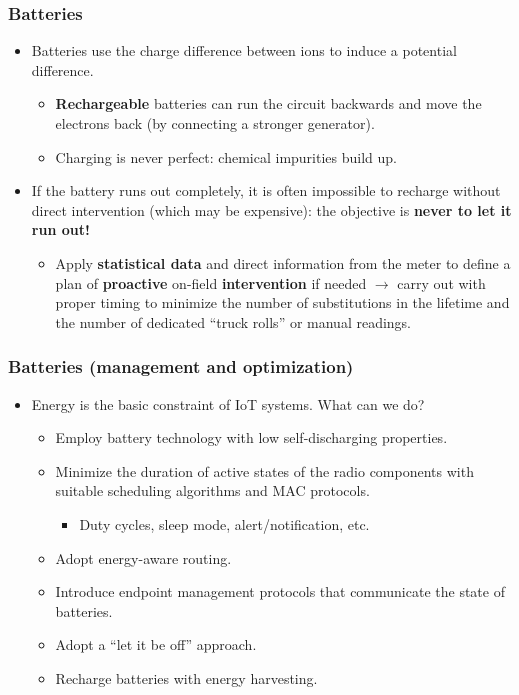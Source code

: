 \subsubsection{Batteries}
\begin{itemize}
    \item Batteries use the charge difference between ions to induce a potential difference.
    \begin{itemize}
        \item \textbf{Rechargeable} batteries can run the circuit backwards and move the electrons back (by connecting a stronger generator).
        \item Charging is never perfect: chemical impurities build up.
    \end{itemize}
    \item If the battery runs out completely, it is often impossible to recharge without direct intervention (which may be expensive): the objective is \textbf{never to let it run out!}
    \begin{itemize}
        \item Apply \textbf{statistical data} and direct information from the meter to define a plan of \textbf{proactive} on-field \textbf{intervention} if needed $\rightarrow$ carry out with proper timing to minimize the number of substitutions in the lifetime and the number of dedicated ``truck rolls'' or manual readings.
    \end{itemize}
\end{itemize}

\subsubsection{Batteries (management and optimization)}
\begin{itemize}
    \item Energy is the basic constraint of IoT systems. What can we do?
    \begin{itemize}
        \item Employ battery technology with low self-discharging properties.
        \item Minimize the duration of active states of the radio components with suitable scheduling algorithms and MAC protocols.
        \begin{itemize}
            \item Duty cycles, sleep mode, alert/notification, etc.
        \end{itemize}
        \item Adopt energy-aware routing.
        \item Introduce endpoint management protocols that communicate the state of batteries.
        \item Adopt a ``let it be off'' approach.
        \item Recharge batteries with energy harvesting.
    \end{itemize}
\end{itemize}

